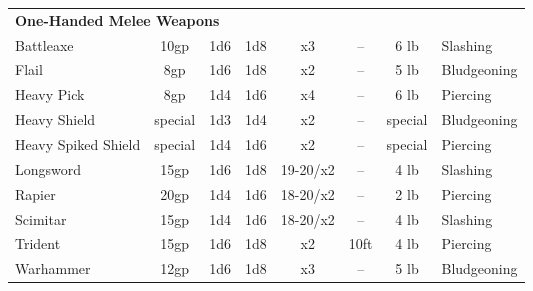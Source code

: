 \begin{table}[htb]
\begin{tabular}{l c c c c c c l}
\multicolumn{8}{l}{\textbf{One-Handed Melee Weapons}}\\
\hspace{.5cm}Battleaxe & 10gp & 1d6 & 1d8 & x3 & -- & 6 lb & Slashing\\
\hspace{.5cm}Flail & 8gp & 1d6 & 1d8 & x2 & -- & 5 lb & Bludgeoning\\
\hspace{.5cm}Heavy Pick & 8gp & 1d4 & 1d6 & x4 & -- & 6 lb & Piercing\\
\hspace{.5cm}Heavy Shield & special & 1d3 & 1d4 & x2 & -- & special & Bludgeoning\\
\hspace{.5cm}Heavy Spiked Shield & special & 1d4 & 1d6 & x2 & -- & special & Piercing\\
\hspace{.5cm}Longsword & 15gp & 1d6 & 1d8 & 19-20/x2 & -- & 4 lb & Slashing\\
\hspace{.5cm}Rapier & 20gp & 1d4 & 1d6 & 18-20/x2 & -- & 2 lb & Piercing\\
\hspace{.5cm}Scimitar & 15gp & 1d4 & 1d6 & 18-20/x2 & -- & 4 lb & Slashing\\
\hspace{.5cm}Trident & 15gp & 1d6 & 1d8 & x2 & 10ft & 4 lb & Piercing\\
\hspace{.5cm}Warhammer & 12gp & 1d6 & 1d8 & x3 & -- & 5 lb & Bludgeoning\\


\end{tabular}
\end{table}
